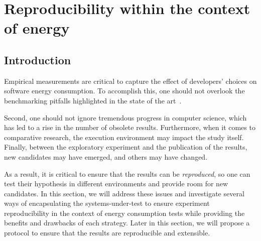\section{Reproducibility within the context of energy}\label{sec:benchmarking_reproducibility}
\subsection{Introduction}

Empirical measurements are critical to capture the effect of developers' choices on software energy consumption.
To accomplish this, one should not overlook the benchmarking pitfalls highlighted in the state of the art~\cite{van_der_kouwe_benchmarking_2018}.

Second, one should not ignore tremendous progress in computer science, which has led to a rise in the number of obsolete results.
Furthermore, when it comes to comparative research, the execution environment may impact the study itself.
Finally, between the exploratory experiment and the publication of the results, new candidates may have emerged, and others may have changed.

As a result, it is critical to ensure that the results can be \emph{reproduced}, so one can test their hypothesis in different environments and provide room for new candidates.
In this section, we will address these issues and investigate several ways of encapsulating the systems-under-test to ensure experiment reproducibility in the context of energy consumption tests while providing the benefits and drawbacks of each strategy.
Later in this section, we will propose a protocol to ensure that the results are reproducible and extensible.








